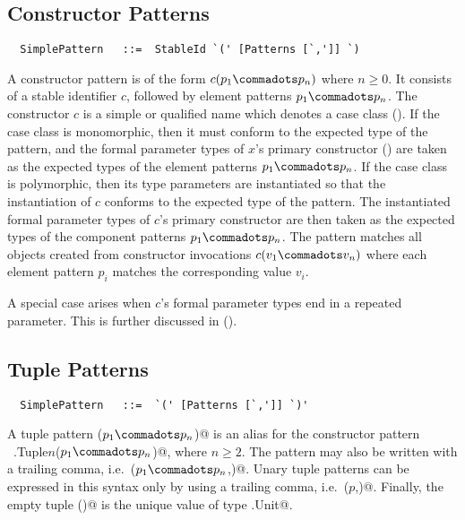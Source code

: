 \subsection{Constructor Patterns}

\syntax\begin{lstlisting}
  SimplePattern   ::=  StableId `(' [Patterns [`,']] `)
\end{lstlisting}

A constructor pattern is of the form $c(p_1 \commadots p_n)$ where $n
\geq 0$. It consists of a stable identifier $c$, followed by element
patterns $p_1 \commadots p_n$. The constructor $c$ is a simple or
qualified name which denotes a case class
(). If the case class is monomorphic, then it
must conform to the expected type of the pattern, and the formal
parameter types of $x$'s primary constructor ()
are taken as the expected types of the element patterns $p_1\commadots
p_n$.  If the case class is polymorphic, then its type parameters are
instantiated so that the instantiation of $c$ conforms to the expected
type of the pattern. The instantiated formal parameter types of $c$'s
primary constructor are then taken as the expected types of the
component patterns $p_1\commadots p_n$.  The pattern matches all
objects created from constructor invocations $c(v_1 \commadots v_n)$
where each element pattern $p_i$ matches the corresponding value
$v_i$.

A special case arises when $c$'s formal parameter types end in a
repeated parameter. This is further discussed in
().

\subsection{Tuple Patterns}

\syntax\begin{lstlisting}
  SimplePattern   ::=  `(' [Patterns [`,']] `)'
\end{lstlisting}

A tuple pattern \lstinline@($p_1 \commadots p_n$)@ is an alias
for the constructor pattern ~\lstinline@scala.Tuple$n$($p_1 \commadots
p_n$)@, where $n \geq 2$.  The pattern may also be written with a
trailing comma, i.e.\ \lstinline@($p_1 \commadots p_n$,)@.  Unary
tuple patterns can be expressed in this syntax only by using a
trailing comma, i.e.\ \lstinline@($p$,)@. Finally, the empty tuple
\lstinline@()@ is the unique value of type \lstinline@scala.Unit@.

